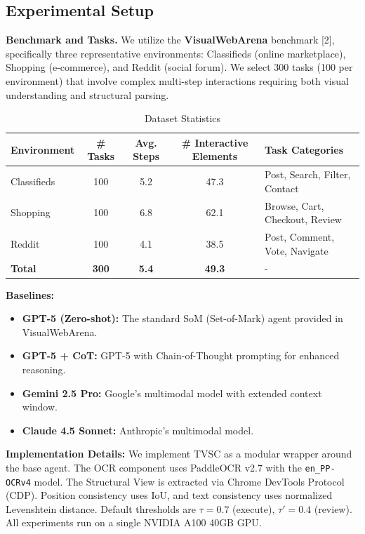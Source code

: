 \documentclass[runningheads]{llncs}
\begin{document}
\subsection{Experimental Setup}
\textbf{Benchmark and Tasks.} We utilize the \textbf{VisualWebArena} benchmark [2], specifically three representative environments: Classifieds (online marketplace), Shopping (e-commerce), and Reddit (social forum). We select 300 tasks (100 per environment) that involve complex multi-step interactions requiring both visual understanding and structural parsing.

\begin{table}[ht]
\caption{Dataset Statistics}\label{tab:dataset}
\centering
\begin{tabular}{|l|c|c|c|l|}
\hline
Environment & \# Tasks & Avg. Steps & \# Interactive Elements & Task Categories \\
\hline
Classifieds & 100 & 5.2 & 47.3 & Post, Search, Filter, Contact \\
Shopping & 100 & 6.8 & 62.1 & Browse, Cart, Checkout, Review \\
Reddit & 100 & 4.1 & 38.5 & Post, Comment, Vote, Navigate \\
\textbf{Total} & \textbf{300} & \textbf{5.4} & \textbf{49.3} & - \\
\hline
\end{tabular}
\end{table}

\textbf{Baselines:}
\begin{itemize}
    \item \textbf{GPT-5 (Zero-shot):} The standard SoM (Set-of-Mark) agent provided in VisualWebArena.
    \item \textbf{GPT-5 + CoT:} GPT-5 with Chain-of-Thought prompting for enhanced reasoning.
    \item \textbf{Gemini 2.5 Pro:} Google's multimodal model with extended context window.
    \item \textbf{Claude 4.5 Sonnet:} Anthropic's multimodal model.
\end{itemize}

\textbf{Implementation Details:}
We implement TVSC as a modular wrapper around the base agent. The OCR component uses PaddleOCR v2.7 with the \texttt{en\_PP-OCRv4} model. The Structural View is extracted via Chrome DevTools Protocol (CDP). Position consistency uses IoU, and text consistency uses normalized Levenshtein distance. Default thresholds are $\tau = 0.7$ (execute), $\tau' = 0.4$ (review). All experiments run on a single NVIDIA A100 40GB GPU.
\end{document}
